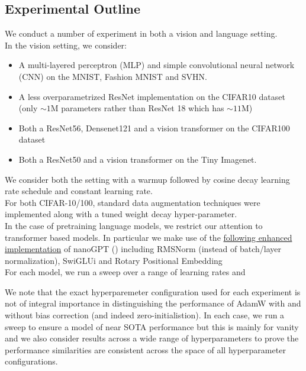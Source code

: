 \documentclass[12pt]{book}
\begin{document}
\subsection{Experimental Outline}
We conduct a number of experiment in both a vision and language setting. \\
In the vision setting, we consider:
\begin{itemize}
\item A multi-layered perceptron (MLP) and simple convolutional neural network (CNN) on the MNIST, Fashion MNIST and SVHN.
\item A less overparametrized ResNet implementation on the CIFAR10 dataset (only $\sim 1$M parameters rather than ResNet 18 which has $\sim 11$M)
\item Both a ResNet56\footnotemark{}, Densenet121 \cite{huang2018denselyconnectedconvolutionalnetworks} and a vision transformer on the CIFAR100 dataset
\item Both a ResNet50 and a vision transformer on the Tiny Imagenet. 
\end{itemize}
We consider both the setting with a warmup followed by cosine decay learning rate schedule and constant learning rate. 
\\
For both CIFAR-10/100, standard data augmentation techniques were implemented along with a tuned weight decay hyper-parameter. 
\\
In the case of pretraining language models, we restrict our attention to transformer based models. In particular we make use of the \href{https://github.com/Niccolo-Ajroldi/plainLM/tree/main}{following enhanced implementation} of nanoGPT (\cite{Karpathy2022}) including RMSNorm (instead of batch/layer normalization), SwiGLUi\cite{swiGLU} and Rotary Positional Embedding
\\
For each model, we run a sweep over a range of learning rates and 

We note that the exact hyperparemeter configuration used for each experiment is not of integral importance in distinguishing the performance of AdamW with and without bias correction (and indeed zero-initialistion). In each case, we run a sweep to ensure a model of near SOTA performance but this is mainly for vanity and we also consider results across a wide range of hyperparameters to prove the performance similarities are consistent across the space of all hyperparameter configurations. 
\\
\end{document}
